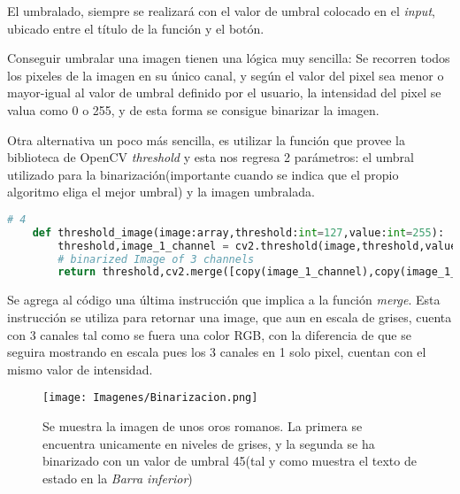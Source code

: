 El umbralado, siempre se realizará con el valor de umbral colocado en el \textit{input}, ubicado entre el título de la función y el botón.

Conseguir umbralar una imagen tienen una lógica muy sencilla: Se recorren todos los pixeles de la imagen en su único canal, y según el valor del pixel sea menor o mayor-igual al valor de umbral definido por el usuario, la intensidad del pixel se valua como 0 o 255, y de esta forma se consigue binarizar la imagen.

Otra alternativa un poco más sencilla, es utilizar la función que provee la biblioteca de OpenCV \textit{threshold} y esta nos regresa 2 parámetros: el umbral utilizado para la binarización(importante cuando se indica que el propio algoritmo eliga el mejor umbral) y la imagen umbralada.


\begin{lstlisting}[language=Python]
	# 4
	def threshold_image(image:array,threshold:int=127,value:int=255):
		threshold,image_1_channel = cv2.threshold(image,threshold,value,cv2.THRESH_BINARY)
		# binarized Image of 3 channels
		return threshold,cv2.merge([copy(image_1_channel),copy(image_1_channel),copy(image_1_channel)])
\end{lstlisting}

Se agrega al código una última instrucción que implica a la función \textit{merge}. Esta instrucción se utiliza para retornar una image, que aun en escala de grises, cuenta con 3 canales tal como se fuera una color RGB, con la diferencia de que se seguira mostrando en escala pues los 3 canales en 1 solo pixel, cuentan con el mismo valor de intensidad.


\begin{figure}[htbp]
	\centering
	\texttt{[image: Imagenes/Binarizacion.png]}
	\caption{Se muestra la imagen de unos oros romanos. La primera se encuentra unicamente en niveles de grises, y la segunda se ha binarizado con un valor de umbral 45(tal y como muestra el texto de estado en la \textit{Barra inferior})}
\end{figure}

